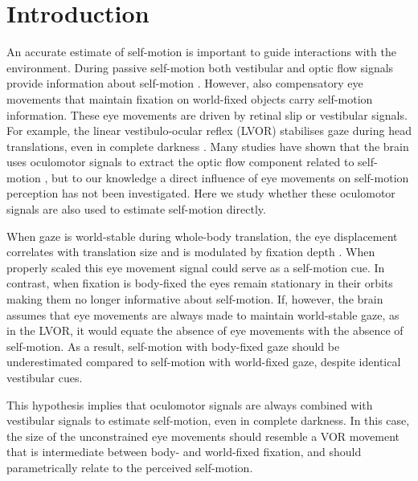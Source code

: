 \newpage


\section{Introduction}

An accurate estimate of self-motion is important to guide interactions with the environment. During passive self-motion both vestibular and optic flow signals provide information about self-motion \cite{gibson1955, benson1986, harris2000, israel1989, angelaki2005, carriot2013, chen2010}. However, also compensatory eye movements that maintain fixation on world-fixed objects carry self-motion information. These eye movements are driven by retinal slip or vestibular signals. For example, the linear vestibulo-ocular reflex (LVOR) stabilises gaze during head translations, even in complete darkness \cite{paige1989,medendorp2002,angelaki2004}.  Many studies have shown that the brain uses oculomotor signals to extract the optic flow component related to self-motion \cite{warren1988, royden1992, freeman1998, lappe1999}, but to our knowledge a direct influence of eye movements on self-motion perception has not been investigated. Here we study whether these oculomotor signals are also used to estimate self-motion directly.

When gaze is world-stable during whole-body translation, the eye displacement correlates with translation size and is modulated by fixation depth \cite{schwarz1989, paige1998, mchenry2000, medendorp2002}. When properly scaled this eye movement signal could serve as a self-motion cue. In contrast, when fixation is body-fixed the eyes remain stationary in their orbits \cite{paige1998, ramat2005} making them no longer informative about self-motion. If, however, the brain assumes that eye movements are always made to maintain world-stable gaze, as in the LVOR, it would equate the absence of eye movements with the absence of self-motion. As a result, self-motion with body-fixed gaze should be underestimated compared to self-motion with world-fixed gaze, despite identical vestibular cues.

This hypothesis implies that oculomotor signals are always combined with vestibular signals to estimate self-motion, even in complete darkness.  In this case, the size of the unconstrained eye movements should resemble a VOR movement that is intermediate between body- and world-fixed fixation, and should parametrically relate to the perceived self-motion.

